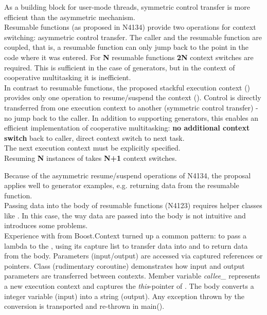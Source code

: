 As a building block for user-mode threads, symmetric control transfer is more
efficient than the asymmetric mechanism.\\
\newline
Resumable functions (as proposed in N4134\cite{N4134}) provide two operations
for context switching: asymmetric control transfer. The caller and the
resumable function are coupled, that is, a resumable function can only jump back
to the point in the code where it was entered.
For {\bfseries N} resumable functions {\bfseries 2N} context switches are
required. This is sufficient in the case of generators, but in the context of
cooperative multitasking it is inefficient.\\
\newline
In contrast to resumable functions, the proposed stackful execution context
(\ectx) provides only one operation to resume/suspend the context (\ectxop).
Control is directly transferred from one execution context to
another (symmetric control transfer) - no jump back to the caller. In addition
to supporting generators, this enables an efficient implementation of
cooperative multitasking: {\bfseries no additional context switch} back to
caller, direct context switch to next task.\\
The next execution context must be explicitly specified.\\
\newline
{}
Resuming {\bfseries N} instances of \ectx takes {\bfseries N+1} context
switches.

Because of the asymmetric resume/suspend operations of N4134, the proposal
applies well to generator examples, e.g. returning data from the resumable
function.\\
\newline
Passing data into the body of resumable functions (N4123) requires helper
classes like \channel.
In this case, the way data are passed into the body is not intuitive and
introduces some problems.\\
\newline
Experience with  from Boost.Context\cite{bcontext}
turned up a common pattern: to pass a lambda to the ,
using its capture list to transfer data into and to return data from the
body. Parameters (input/output) are accessed via captured references or
pointers.
Class  (rudimentary coroutine) demonstrates how input and output
parameters are transferred between contexts. Member variable
\emph{callee\_} represents a new execution context and captures the
\emph{this}-pointer of . The body converts a integer variable (input)
into a string (output). Any exception thrown by the conversion is transported
and re-thrown in main().

